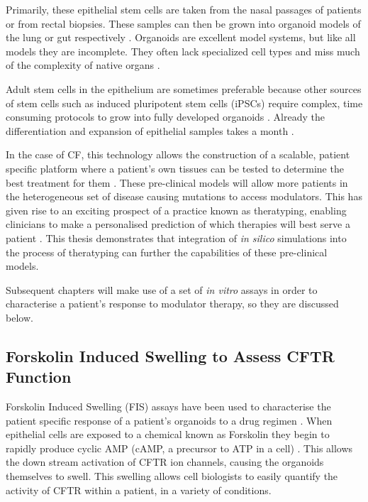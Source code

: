 Primarily, these epithelial stem cells are taken from the nasal passages of patients or from rectal biopsies. These samples can then be grown into organoid models of the lung or gut respectively \cite{}. Organoids are excellent model systems, but like all models they are incomplete. They often lack specialized cell types and miss much of the complexity of native organs \cite{clevers2016}. 

Adult stem cells in the epithelium are sometimes preferable because other sources of stem cells such as induced pluripotent stem cells (iPSCs) require complex, time consuming protocols to grow into fully developed organoids \cite{}. Already the differentiation and expansion of epithelial samples takes a month \cite{}.

In the case of CF, this technology allows the construction of a scalable, patient specific platform where a patient's own tissues can be tested to determine the best treatment for them \cite{}. These pre-clinical models will allow more patients in the heterogeneous set of disease causing mutations to access modulators. This has given rise to an exciting prospect of a practice known as theratyping, enabling clinicians to make a personalised prediction of which therapies will best serve a patient \cite{clancy2019, wong2022, wong2022a, ciciriello2022}. This thesis demonstrates that integration of \textit{in silico} simulations into the process of theratyping can further the capabilities of these pre-clinical models.

Subsequent chapters will make use of a set of \textit{in vitro} assays in order to characterise a patient's response to modulator therapy, so they are discussed below.

\subsection{Forskolin Induced Swelling to Assess CFTR Function}
Forskolin Induced Swelling (FIS) assays have been used to characterise the patient specific response of a patient's organoids to a drug regimen \cite{dekkers2013}. When epithelial cells are exposed to a chemical known as Forskolin they begin to rapidly produce cyclic AMP (cAMP, a precursor to ATP in a cell) \cite{}. This allows the down stream activation of CFTR ion channels, causing the organoids themselves to swell. This swelling allows cell biologists to easily quantify the activity of CFTR within a patient, in a variety of conditions.

